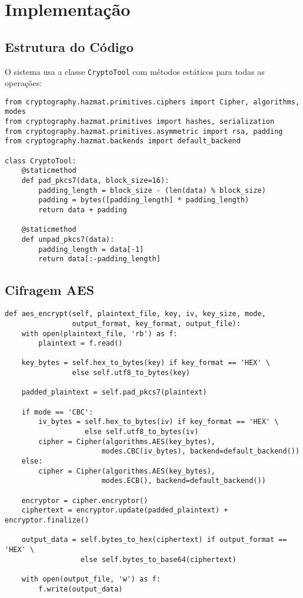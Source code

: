 \documentclass[12pt,a4paper]{article}
\begin{document}
\section{Implementação}

\subsection{Estrutura do Código}

O sistema usa a classe \texttt{CryptoTool} com métodos estáticos para todas as operações:

\begin{lstlisting}[caption={Imports e Estrutura Principal}]
from cryptography.hazmat.primitives.ciphers import Cipher, algorithms, modes
from cryptography.hazmat.primitives import hashes, serialization
from cryptography.hazmat.primitives.asymmetric import rsa, padding
from cryptography.hazmat.backends import default_backend

class CryptoTool:
    @staticmethod
    def pad_pkcs7(data, block_size=16):
        padding_length = block_size - (len(data) % block_size)
        padding = bytes([padding_length] * padding_length)
        return data + padding
    
    @staticmethod
    def unpad_pkcs7(data):
        padding_length = data[-1]
        return data[:-padding_length]
\end{lstlisting}

\subsection{Cifragem AES}

\begin{lstlisting}[caption={Função AES Encrypt (simplificada)}]
def aes_encrypt(self, plaintext_file, key, iv, key_size, mode, 
                output_format, key_format, output_file):
    with open(plaintext_file, 'rb') as f:
        plaintext = f.read()
    
    key_bytes = self.hex_to_bytes(key) if key_format == 'HEX' \
                else self.utf8_to_bytes(key)
    
    padded_plaintext = self.pad_pkcs7(plaintext)
    
    if mode == 'CBC':
        iv_bytes = self.hex_to_bytes(iv) if key_format == 'HEX' \
                   else self.utf8_to_bytes(iv)
        cipher = Cipher(algorithms.AES(key_bytes), 
                       modes.CBC(iv_bytes), backend=default_backend())
    else:
        cipher = Cipher(algorithms.AES(key_bytes), 
                       modes.ECB(), backend=default_backend())
    
    encryptor = cipher.encryptor()
    ciphertext = encryptor.update(padded_plaintext) + encryptor.finalize()
    
    output_data = self.bytes_to_hex(ciphertext) if output_format == 'HEX' \
                  else self.bytes_to_base64(ciphertext)
    
    with open(output_file, 'w') as f:
        f.write(output_data)
\end{lstlisting}
\end{document}
